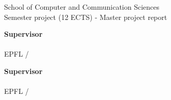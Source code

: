 \begin{titlepage}
\begin{center}
    
    \vspace*{3cm}
    \Huge
    \mytitle
    
    \vspace*{3cm}
    \LARGE
    \authorname
    
    \vspace{2cm}
    
    \Large
    School of Computer and Communication Sciences \\
    \large
    Semester project (12 ECTS) - Master project report
    
    \vspace{4 cm}

    \begin{minipage}[t]{0.47\textwidth}
	\textnormal{\Large{\bf Supervisor\\}}
	{\large \supervisor \\ EPFL / \labname}
\end{minipage}\hfill\begin{minipage}[t]{0.47\textwidth}\raggedleft
	\textnormal{\Large{\bf Supervisor\\}}
	{\large \professor \\ EPFL / \labname}
\end{minipage}
    
\end{center}
\end{titlepage}